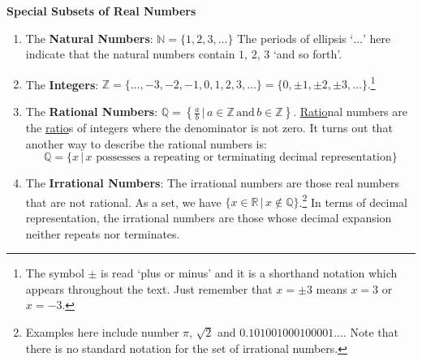\documentclass[11pt]{article}
\theoremstyle{definition}  %
\newcommand{\bbm}{\begin{boxedminipage}{6.41in}}
\newcommand{\ebm}{\end{boxedminipage}}
\begin{document}
\label{setsofnumbersboxonthispage}

\colorbox{ResultColor}{\bbm

\centerline{\textbf{Special Subsets of Real Numbers}}

\begin{enumerate}

\item The \textbf{Natural Numbers}: $\mathbb{N}= \{ 1, 2, 3,  \ldots\}$ The periods of ellipsis `$\ldots$' here indicate that the natural numbers contain $1$, $2$, $3$ `and so forth'.


\item The \textbf{Integers}: $\mathbb Z=\{ \ldots, -3, -2, -1, 0, 1, 2, 3, \ldots \} = \{ 0, \pm 1, \pm 2, \pm 3, \ldots\}.$\footnote{The symbol $\pm$ is read `plus or minus' and it is a shorthand notation which appears throughout the text.  Just remember that $x = \pm 3$ means $x = 3$ or $x = -3$.}

\item The \textbf{Rational Numbers}: $\mathbb{Q}=\left\{\frac{a}{b} \, | \, a \in \mathbb Z \, \mbox{and} \, b \in \mathbb Z \right\}$.  \underline{Ratio}nal numbers are the \underline{ratio}s of integers where the denominator is not zero.  It turns out that another way to describe the rational numbers is: \[\mathbb{Q}=\{x\,|\,\mbox{$x$ possesses a repeating or terminating decimal representation}\}\]

\item The \textbf{Irrational Numbers}: The irrational numbers are those real numbers that are not rational. As a set, we have  $\{x\in\mathbb{R}\,|\,x\notin\mathbb{Q}\}$.\footnote{Examples here include number $\pi$, $\sqrt{2}$ and $0.101001000100001\ldots$. Note that there is no standard notation for the set of irrational numbers.}  In terms of decimal representation, the irrational numbers are those whose decimal expansion neither repeats nor terminates.

\end{enumerate}

\ebm}
\end{document}
